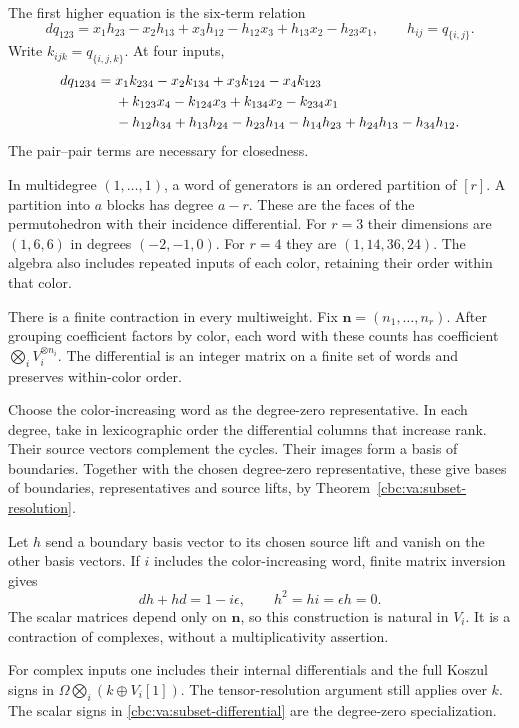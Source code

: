 The first higher equation is the six-term relation
\begin{equation}\label{cbc:va:triple-differential}
 dq_{123}=x_1h_{23}-x_2h_{13}+x_3h_{12}
             -h_{12}x_3+h_{13}x_2-h_{23}x_1,
 \qquad h_{ij}=q_{\{i,j\}}.
\end{equation}
Write $k_{ijk}=q_{\{i,j,k\}}$. At four inputs,
\begin{align}
 dq_{1234}={}&x_1k_{234}-x_2k_{134}+x_3k_{124}-x_4k_{123}
                  \notag\\
 &+k_{123}x_4-k_{124}x_3+k_{134}x_2-k_{234}x_1
                  \notag\\
 &-h_{12}h_{34}+h_{13}h_{24}-h_{23}h_{14}
       -h_{14}h_{23}+h_{24}h_{13}-h_{34}h_{12}.
 \label{cbc:va:four-differential}
\end{align}
The pair--pair terms are necessary for closedness.

In multidegree $(1,\ldots,1)$, a word of generators
is an ordered partition of $[r]$. A partition into
$a$ blocks has degree $a-r$. These are the faces
of the permutohedron with their incidence
differential. For $r=3$ their dimensions are
$(1,6,6)$ in degrees $(-2,-1,0)$. For $r=4$
they are $(1,14,36,24)$.
The algebra also includes repeated inputs of each
color, retaining their order within that color.

There is a finite contraction in every multiweight.
Fix $\mathbf n=(n_1,\ldots,n_r)$.
After grouping coefficient factors by color, each
word with these counts has coefficient
$\bigotimes_iV_i^{\otimes n_i}$.
The differential is an integer matrix on a finite
set of words and preserves within-color order.

Choose the color-increasing word as the degree-zero
representative. In each degree, take in lexicographic
order the differential columns that increase rank.
Their source vectors complement the cycles. Their
images form a basis of boundaries.
Together with the chosen degree-zero representative,
these give bases of boundaries, representatives
and source lifts, by
Theorem~\ref{cbc:va:subset-resolution}.

Let $h$ send a boundary basis vector to its chosen
source lift and vanish on the other basis vectors.
If $i$ includes the color-increasing word, finite
matrix inversion gives
\[
 dh+hd=1-i\epsilon,\qquad
 h^2=hi=\epsilon h=0.
\]
The scalar matrices depend only on $\mathbf n$, so
this construction is natural in $V_i$.
It is a contraction of complexes, without a
multiplicativity assertion.

For complex inputs one includes their internal
differentials and the full Koszul signs in
$\Omega\bigotimes_i(k\oplus V_i[1])$.
The tensor-resolution argument still applies over
$k$. The scalar signs in
\eqref{cbc:va:subset-differential} are the
degree-zero specialization.

